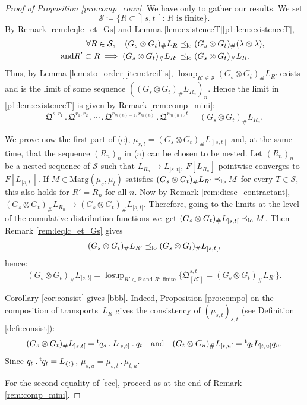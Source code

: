 \documentclass[JEP,XML,SOM,Unicode,NoEqCountersInSection,NoFloatCountersInSection,published]{cedram}
\newcommand{\ldot}{\mathbin{.}}
\newcommand{\lcdots}{\ldot\cdots\ldot}
\theoremstyle{plain}
\theoremstyle{definition}
\newcommand{\como}{\mathfrak{Q}}
\newcommand{\trans}{{}^{\mathrm{t}}\mkern-1mu}
\newcommand{\eqdef}{\coloneqq}
\newcommand{\la}{\lambda}
\newcommand{\ma}{\mathrm{Marg}}
\newcommand{\R}{\mathbb{R}}
\newcommand{\AND}{\quad\text{and}\quad}
\newcommand{\lcsup}{\operatorname{losup}}
\newcommand{\op}{\mathopen}
\newcommand{\clo}{\mathclose}
\newcommand{\leqlc}{\preceq_{\rm lo}}
\begin{document}
\begin{proof}[Proof of Proposition \ref{pro:comp_conv}] We have only to gather our results. We set
\[
\mathcal{S}\eqdef\{R\subset \op]s,t\clo[:\,R\text{ is finite}\}.
\]
By Remark \ref{rem:leqlc_et_Gs} and Lemma \ref{lem:existenceT}\eqref{p1:lem:existenceT},
\begin{align*}
\forall R\in\mathcal{S},\quad (G_s\otimes G_t)_\#L_R&\leqlc (G_s\otimes G_t)_\#(\la\otimes \la),\\
\tag*{and}
R'\subset R\implies(G_s\otimes G_t)_\#L_{R'}&\leqlc (G_s\otimes G_t)_\#L_{R}. 
\end{align*}
Thus, by Lemma \ref{lem:sto_order}\eqref{item:treillis}, $\lcsup_{R'\in\mathcal{S}}(G_s\otimes G_t)_\#L_{R'}$ exists and is the limit of some sequence $((G_s\otimes G_t)_\#L_{R_n})_n$. Hence the limit in \eqref{p1:lem:existenceT} is given by Remark \ref{rem:comp_mini}:
\[\como^{s,r_1}{}\ldot\como^{r_1,r_2}\lcdots \como^{r_{m(n)-1},r_{m(n)}}{}\ldot\como^{r_{m(n)},t}=(G_s\otimes G_t)_\#L_{R_n}.\]

We prove now the first part of (c), \ie $\mu_{s,t}=(G_s\otimes G_t)_\#L_{\op]s,t\clo[}$ and, at the same time, that the sequence $(R_n)_n$ in (a) can be chosen to be nested. Let $(R_n)_n$ be a nested sequence of $\mathcal{S}$ such that $L_{R_n}\to L_{]s,t[}$, \ie $F[L_{R_n}]$ pointwise converges to $F[L_{]s,t[}]$. If $M\in \ma(\mu_s,\mu_t)$ satisfies $(G_s\otimes G_t)_\#L_{R'}\leqlc M$ for every $T\in \mathcal{S}$, this also holds for $R'=R_n$ for all $n$. Now by Remark \ref{rem:diese_contractant}, $(G_s\otimes G_t)_\#L_{R_n}\to (G_s\otimes G_t)_\#L_{]s,t[}$. Therefore, going to the limits at the level of the cumulative distribution functions we~get $(G_s\otimes G_t)_\#L_{]s,t[}\leqlc M$. Then Remark \ref{rem:leqlc_et_Gs} gives
\[
(G_s\otimes G_t)_\#L_{R'}\leqlc(G_s\otimes G_t)_\#L_{]s,t[},
\]
hence:
\[(G_s\otimes G_t)_\#L_{]s,t[}=\lcsup_{R'\subset\R\ \text{and $R'$ finite}}\bigl\{\como^{s,t}_{[R']}=(G_s\otimes G_t)_\#L_{R'}\bigr\}.\]

Corollary \ref{cor:consist} gives \eqref{bbb}. Indeed, Proposition \ref{pro:compo} on the composition of transports~$L_R$ gives the consistency of $(\mu_{s,t})_{s,t}$ (see Definition \ref{defi:consist}):
\[
(G_s\otimes G_t)_\#L_{\op]s,t\clo[}=\trans{q}_s \ldot L_{\op]s,t\clo[}{}\ldot q_t\AND (G_t\otimes G_u)_\#L_{]t,u[}=\trans{q}_t L_{]t,u[}q_u.
\]
Since $q_t\ldot\trans{q}_t=L_{\{t\}}$, $\mu_{s,u}=\mu_{s,t}{}\ldot\mu_{t,u}$.

For the second equality of \eqref{ccc}, proceed as at the end of Remark \ref{rem:comp_mini}.
\end{proof}
\end{document}
